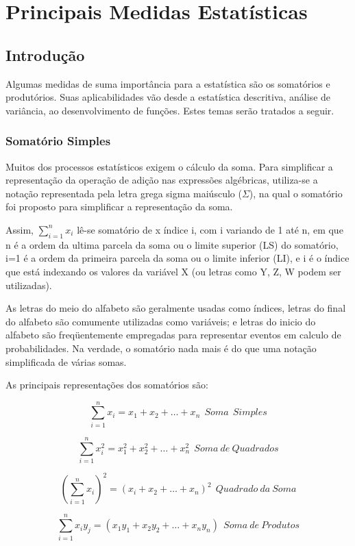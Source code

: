 \chapter{Principais Medidas Estatísticas}

\section{Introdução}

Algumas medidas de suma importância para a estatística são os somatórios e produtórios. Suas aplicabilidades vão desde a estatística descritiva, análise de variância, ao desenvolvimento de funções. Estes temas serão tratados a seguir.


\subsection{Somatório Simples}

\inic Muitos dos processos estatísticos exigem o cálculo da soma. Para simplificar a representação da operação de adição nas expressões algébricas, utiliza-se a notação representada pela letra grega sigma maiúsculo ($\Sigma$), na qual o somatório foi proposto para simplificar a representação da soma.\vskip0.3cm


Assim, $\sum_{i=1}^{n}x_{i}$  lê-se  somatório de x índice i, com i variando de 1 até n, em que n é a ordem da ultima parcela da soma ou o limite superior (LS) do somatório, i=1 é a ordem da primeira parcela da soma ou o limite inferior (LI), e i é o índice que está indexando os valores da variável  X (ou letras como Y, Z, W podem ser utilizadas).\vskip0.3cm

As letras do meio do alfabeto são geralmente usadas como índices, letras do final do alfabeto são comumente utilizadas como variáveis; e letras do inicio do alfabeto são freqüentemente empregadas para representar eventos em calculo de probabilidades. Na verdade, o somatório nada mais é do que uma notação simplificada de várias somas.\vskip0.3cm

As principais representações dos somatórios são:


$$\sum_{i=1}^{n}x_{i}=x_{1}+x_{2}+\ldots+x_{n} \ \ Soma \ \ Simples$$

$$\sum_{i=1}^{n}x_{i}^{2}=x_{1}^{2}+x_{2}^{2}+\ldots+x_{n}^{2} \ \ Soma \ de \ Quadrados$$


$$ \left(\sum_{i=1}^{n}x_{i}\right)^{2}=(x_{i}+x_{2}+\ldots+x_{n})^{2} \ \ Quadrado \ da \ Soma$$

$$ \sum_{i=1}^{n}x_{i}y_{j}=(x_{1}y_{1}+x_{2}y_{2}+\ldots+x_{n}y_{n}) \ \ Soma \ de \ Produtos$$


